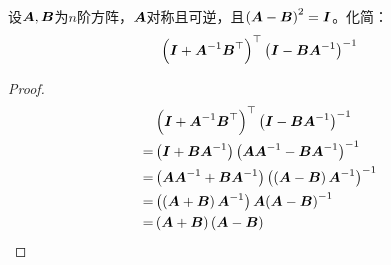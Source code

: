 \begin{suplprob}
    设\(\mata,\matb\)为\(n\)阶方阵，\(\mata\)对称且可逆，且\(\mypar{\mata-\matb}^2=\mati\)。化简：
    \begin{equation*}
        \mypar{\mati+\inv{\mata}\matb^\top}^\top\inv{\mypar{\mati-\matb\inv{\mata}}}
    \end{equation*}
\end{suplprob}
\begin{proof}
    \begin{align*}
          & \mypar{\mati+\inv{\mata}\matb^\top}^\top\inv{\mypar{\mati-\matb\inv{\mata}}}          \\
        = & \mypar{\mati+\matb\inv{\mata}}\inv{\mypar{\mata\inv{\mata}-\matb\inv{\mata}}}         \\
        = & \mypar{\mata\inv{\mata}+\matb\inv{\mata}}\inv{\mypar{\mypar{\mata-\matb}\inv{\mata}}} \\
        = & \mypar{\mypar{\mata+\matb}\inv{\mata}}\mata\inv{\mypar{\mata-\matb}}                  \\
        = & \mypar{\mata+\matb}\mypar{\mata-\matb}
    \end{align*}
\end{proof}